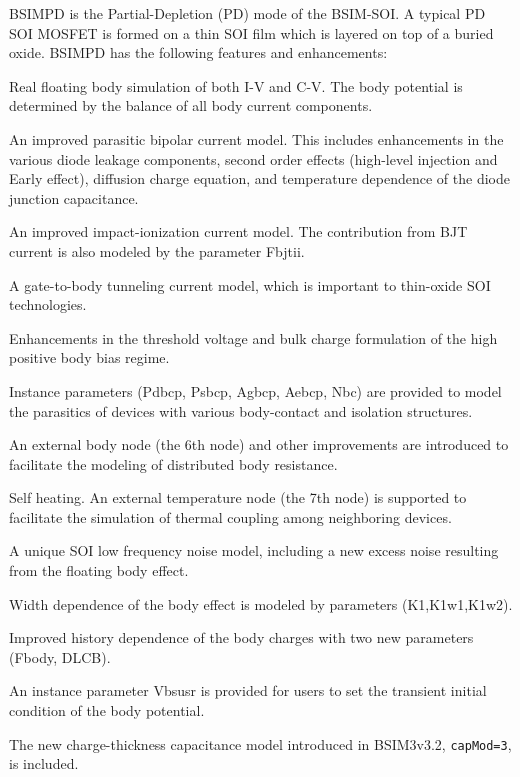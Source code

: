 BSIMPD is the
Partial-Depletion (PD) mode of the BSIM-SOI.  A typical PD SOI MOSFET is formed
on a thin SOI film which is layered on top of a buried oxide.  BSIMPD has
the following features and enhancements:
\begin{XyceItemize}
\item Real floating body simulation of both I-V and C-V.  The body potential is
      determined by the balance of all body current components.
\item An improved parasitic bipolar current model.  This includes enhancements in
      the various diode leakage components, second order effects (high-level
      injection and Early effect), diffusion charge equation, and temperature
      dependence of the diode junction capacitance.
\item An improved impact-ionization current model.  The contribution from BJT
      current is also modeled by the parameter Fbjtii.
\item A gate-to-body tunneling current model, which is important to thin-oxide
      SOI technologies.
\item Enhancements in the threshold voltage and bulk charge formulation of the
      high positive body bias regime.
\item Instance parameters (Pdbcp, Psbcp, Agbcp, Aebcp, Nbc) are provided to model
      the parasitics of devices with various body-contact and isolation structures.
\item An external body node (the 6th node) and other improvements are introduced
      to facilitate the modeling of distributed body resistance.
\item Self heating.  An external temperature node (the 7th node) is supported to
      facilitate the simulation of thermal coupling among neighboring devices.
\item A unique SOI low frequency noise model, including a new excess noise resulting
      from the floating body effect.
\item Width dependence of the body effect is modeled by parameters (K1,K1w1,K1w2).
\item Improved history dependence of the body charges with two new parameters
      (Fbody, DLCB).
\item An instance parameter Vbsusr is provided for users to set the transient initial
      condition of the body potential.
\item The new charge-thickness capacitance model introduced in BSIM3v3.2,
      \texttt{capMod=3}, is included.
\end{XyceItemize}

